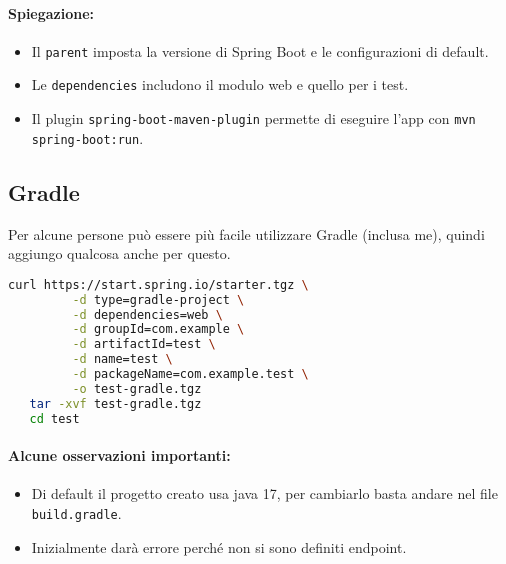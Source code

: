 \paragraph{Spiegazione:}
\begin{itemize}
	\item Il \texttt{parent} imposta la versione di Spring Boot e le configurazioni di default.
	\item Le \texttt{dependencies} includono il modulo web e quello per i test.
	\item Il plugin \texttt{spring-boot-maven-plugin} permette di eseguire l'app con \texttt{mvn spring-boot:run}.
\end{itemize}
\subsection{Gradle}

Per alcune persone può essere più facile utilizzare Gradle (inclusa me), quindi aggiungo qualcosa anche per questo.



\begin{lstlisting}[language=bash, caption={Creazione di un progetto Spring Boot con Gradle}]
curl https://start.spring.io/starter.tgz \
         -d type=gradle-project \
         -d dependencies=web \
         -d groupId=com.example \
         -d artifactId=test \
         -d name=test \
         -d packageName=com.example.test \
         -o test-gradle.tgz
   tar -xvf test-gradle.tgz
   cd test
\end{lstlisting}

\paragraph{Alcune osservazioni importanti:}

\begin{itemize}
	\item Di default il progetto creato usa java 17, per cambiarlo basta andare nel file \texttt{build.gradle}.
	\item Inizialmente darà errore perché non si sono definiti endpoint.
\end{itemize}

